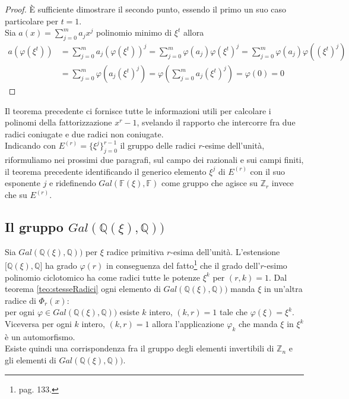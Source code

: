 \begin{proof}
È sufficiente dimostrare il secondo punto, essendo il primo un suo caso
particolare per $t = 1$. \\
Sia $a(x) = \sum_{j=0}^{m} a_{j}x^j$ polinomio minimo di $\xi^{t}$
allora
\begin{align*}
      a(\varphi(\xi^t) ) &= \sum_{j=0}^{m} a_{j} (\varphi(\xi^t) )^j
                  = \sum_{j=0}^{m} \varphi(a_{j}) \varphi(\xi^t)^j
                  = \sum_{j=0}^{m} \varphi(a_{j}) \varphi((\xi^t )^j) \\
                  &= \sum_{j=0}^{m} \varphi(a_{j}(\xi^t)^j)
                  = \varphi( \sum_{j=0}^{m} a_{j} (\xi^t )^j )
                  = \varphi(0) = 0
\end{align*}
\end{proof}
Il teorema precedente ci fornisce tutte le informazioni utili per calcolare i
polinomi della fattorizzazione $x^r - 1$, svelando il rapporto che intercorre
fra due radici coniugate e due radici non coniugate.\\
Indicando con $E^{(r)} = \lbrace \xi^{j}\rbrace_{j=0}^{r-1}$ il gruppo delle
radici $r$-esime dell'unità, riformuliamo nei prossimi due paragrafi, sul campo dei
razionali e sui campi finiti, il teorema precedente
identificando il generico elemento $\xi^{j}$ di $E^{(r)}$ con il suo esponente
$j$ e ridefinendo $Gal(\mathbb{F}(\xi), \mathbb{F})$ come gruppo che agisce su $\mathbb{Z}_{r}$ invece che su
$E^{(r)}$.

\subsection{Il gruppo $Gal(\mathbb{Q}(\xi), \mathbb{Q}))$} \label{cap2:Grazionali}

Sia $Gal(\mathbb{Q}(\xi), \mathbb{Q}))$ per $\xi$ radice primitiva $r$-esima
dell'unità. L'estensione $\lbrack \mathbb{Q}(\xi), \mathbb{Q} \rbrack$ ha grado
$\varphi(r)$ in conseguenza del fatto\footnote{\cite{cattaneo} pag. 133.} che il grado dell'$r$-esimo polinomio
ciclotomico ha come radici tutte le potenze $\xi^{k}$ per $(r,k) = 1$.
Dal teorema \ref{teo:stesseRadici} ogni elemento di $Gal(\mathbb{Q}(\xi), \mathbb{Q}))$ manda $\xi$ in un'altra radice
di $\Phi_{r}(x)$:  \\
per ogni $\varphi \in Gal(\mathbb{Q}(\xi), \mathbb{Q}))$ esiste $k$ intero, $(k,r) = 1$ tale che
$\varphi(\xi) = \xi^k $.  \\
Viceversa per ogni $k$ intero, $(k,r) = 1$ allora l'applicazione $\varphi_{k}$
che manda $\xi$ in $\xi^{k}$ è un automorfismo. \\
Esiste quindi una corrispondenza fra il gruppo degli elementi invertibili di
$\mathbb{Z}_{n}$ e gli elementi di $Gal(\mathbb{Q}(\xi), \mathbb{Q}))$.

